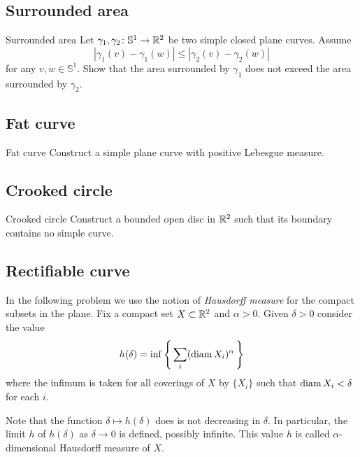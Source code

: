 \subsection*{Surrounded area}

\begin{pr}{\easy}{Surrounded area}\label{Surrounded area}
Let $\gamma_1,\gamma_2\colon\mathbb S^1\to\mathbb{R}^2$ be two simple closed plane curves.
Assume 
\[|\gamma_1(v)-\gamma_1(w)|\le|\gamma_2(v)-\gamma_2(w)|\]
for any $v,w\in \mathbb S^1$.
Show that the area surrounded by $\gamma_1$ does not exceed the area surrounded by $\gamma_2$. 
\end{pr}

\subsection*{Fat curve}

\begin{pr}{\easy}{Fat curve}\label{Fat curve}
Construct a simple plane curve with positive Lebesgue measure.
\end{pr}


\subsection*{Crooked circle}

\begin{pr}{}{Crooked circle}\label{Crooked circle} 
Construct 
a bounded open disc in $\mathbb{R}^2$ 
such that 
its boundary contains no simple curve.
\end{pr}

\subsection*{Rectifiable curve}

In the following problem we use the notion of 
\emph{Hausdorff measure} for the compact subsets in the plane.
Fix a compact set $X\subset\mathbb{R}^2$ and $\alpha>0$.
Given $\delta>0$ consider the value
\[h(\delta)=\inf\left\{\,\sum_i(\operatorname{\rm diam} X_i)^\alpha\,\right\}\]
where the infimum is taken for all coverings of $X$ by $\{X_i\}$
such that $\operatorname{\rm diam} X_i<\delta$ for each $i$.

Note that the function $\delta\mapsto h(\delta)$ does is not decreasing in $\delta$.
In particular, the limit $h$ of $h(\delta)$ as $\delta\to0$ is defined, possibly infinite.
This value $h$ is called $\alpha$-dimensional Hausdorff measure of $X$.

